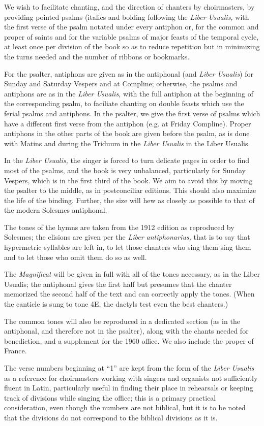 \begin{enpars}
We wish to facilitate chanting, and the direction of chanters by choirmasters, by providing pointed psalms (italics and bolding following the \textit{Liber Usualis,} with the first verse of the psalm notated under every antiphon or, for the common and proper of saints and for the variable psalms of major feasts of the temporal cycle, at least once per division of the book so as to reduce repetition but in minimizing the turns needed and the number of ribbons or bookmarks.

For the psalter, antiphons are given as in the antiphonal (and \textit{Liber Usualis}) for Sunday and Saturday Vespers and at Compline; otherwise, the psalms and antiphons are as in the \textit{Liber Usualis,} with the full antiphon at the beginning of the corresponding psalm, to faciliate chanting on double feasts which use the ferial psalms and antiphons. In the psalter, we give the first verse of psalms which have a different first verse from the antiphon (e.g. at Friday Compline). Proper antiphons in the other parts of the book are given before the psalm, as is done with Matins and during the Triduum in the \textit{Liber Usualis} in the Liber Usualis.

In the \textit{Liber Usualis,} the singer is forced to turn delicate pages in order to find most of the psalms, and the book is very unbalanced, particularly for Sunday Vespers, which is in the first third of the book. We aim to avoid this by moving the psalter to the middle, as in postconciliar editions. This should also maximize the life of the binding. Further, the size will hew as closely as possible to that of the modern Solesmes antiphonal.

The tones of the hymns are taken from the 1912 edition as reproduced by Solesmes; the elisions are given per the \textit{Liber antiphonarius,} that is to say that hypermetric syllables are left in, to let those chanters who sing them sing them and to let those who omit them do so as well.

The \textit{Magnificat} will be given in full with all of the tones necessary, as in the Liber Usualis; the antiphonal gives the first half but presumes that the chanter memorized the second half of the text and can correctly apply the tones. (When the canticle is sung to tone 4E, the dactyls test even the best chanters.)

The common tones will also be reproduced in a dedicated section (as in the antiphonal, and therefore not in the psalter), along with the chants needed for benediction, and a supplement for the 1960 office. We also include the proper of France.

The verse numbers beginning at ``1'' are kept from the form of the \textit{Liber Usualis} as a reference for choirmasters working with singers and organists not sufficiently fluent in Latin, particularly useful in finding their place in rehearsals or keeping track of divisions while singing the office; this is a primary practical consideration, even though the numbers are not biblical, but it is to be noted that the divisions do not correspond to the biblical divisions as it is.
\end{enpars}
